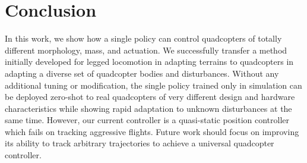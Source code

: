 \section{Conclusion}
In this work, we show how a single policy can control quadcopters of totally different morphology, mass, and actuation. 
%
We successfully transfer a method initially developed for legged locomotion in adapting terrains to quadcopters in adapting a diverse set of quadcopter bodies and disturbances.
%
Without any additional tuning or modification, the single policy trained only in simulation can be deployed zero-shot to real quadcopters of very different design and hardware characteristics while showing rapid adaptation to unknown disturbances at the same time.
%
However, our current controller is a quasi-static position controller which fails on tracking aggressive flights. 
%
Future work should focus on improving its ability to track arbitrary trajectories to achieve a universal quadcopter controller. 
%
%
%
%
%
%

